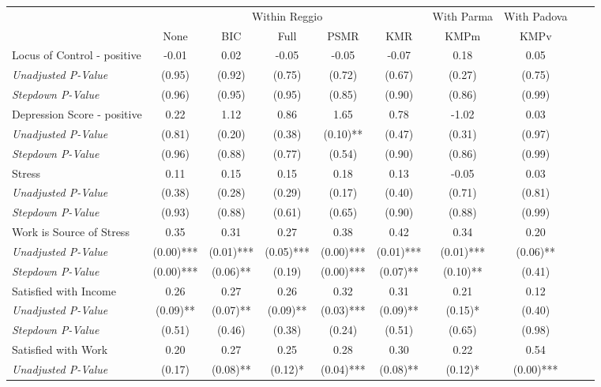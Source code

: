 \begin{tabular}{l c c c c c c c c c}
\toprule
& \multicolumn{5}{c}{Within Reggio} & With Parma & With Padova \\\cmidrule(lr){2-6} \cmidrule(lr){7} \cmidrule(lr){8}
 & None & BIC & Full & PSMR & KMR & KMPm & KMPv \\
\midrule
Locus of Control - positive & -0.01 & 0.02 & -0.05 & -0.05 & -0.07 & 0.18 & 0.05 \\
\quad \textit{Unadjusted P-Value} & (0.95) & (0.92) & (0.75) & (0.72) & (0.67) & (0.27) & (0.75) \\
\quad \textit{Stepdown P-Value} & (0.96) & (0.95) & (0.95) & (0.85) & (0.90) & (0.86) & (0.99) \\
Depression Score - positive & 0.22 & 1.12 & 0.86 & 1.65 & 0.78 & -1.02 & 0.03 \\
\quad \textit{Unadjusted P-Value} & (0.81) & (0.20) & (0.38) & (0.10)** & (0.47) & (0.31) & (0.97) \\
\quad \textit{Stepdown P-Value} & (0.96) & (0.88) & (0.77) & (0.54) & (0.90) & (0.86) & (0.99) \\
Stress & 0.11 & 0.15 & 0.15 & 0.18 & 0.13 & -0.05 & 0.03 \\
\quad \textit{Unadjusted P-Value} & (0.38) & (0.28) & (0.29) & (0.17) & (0.40) & (0.71) & (0.81) \\
\quad \textit{Stepdown P-Value} & (0.93) & (0.88) & (0.61) & (0.65) & (0.90) & (0.88) & (0.99) \\
Work is Source of Stress & 0.35 & 0.31 & 0.27 & 0.38 & 0.42 & 0.34 & 0.20 \\
\quad \textit{Unadjusted P-Value} & (0.00)*** & (0.01)*** & (0.05)*** & (0.00)*** & (0.01)*** & (0.01)*** & (0.06)** \\
\quad \textit{Stepdown P-Value} & (0.00)*** & (0.06)** & (0.19) & (0.00)*** & (0.07)** & (0.10)** & (0.41) \\
Satisfied with Income & 0.26 & 0.27 & 0.26 & 0.32 & 0.31 & 0.21 & 0.12 \\
\quad \textit{Unadjusted P-Value} & (0.09)** & (0.07)** & (0.09)** & (0.03)*** & (0.09)** & (0.15)* & (0.40) \\
\quad \textit{Stepdown P-Value} & (0.51) & (0.46) & (0.38) & (0.24) & (0.51) & (0.65) & (0.98) \\
Satisfied with Work & 0.20 & 0.27 & 0.25 & 0.28 & 0.30 & 0.22 & 0.54 \\
\quad \textit{Unadjusted P-Value} & (0.17) & (0.08)** & (0.12)* & (0.04)*** & (0.08)** & (0.12)* & (0.00)*** \\

\end{tabular}
